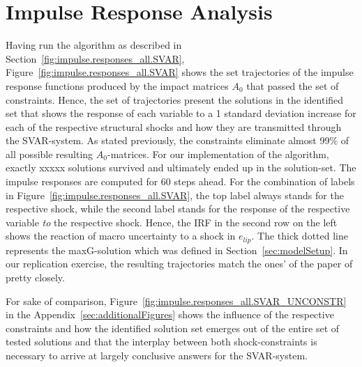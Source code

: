\documentclass[a4paper,11pt,listof=nochaptergap,oneside,pointednumbers,bibtotoc,bigheadings,liststotoc]{scrbook}
\theoremstyle{mysatz}
\theoremstyle{mydefinition}
\theoremstyle{mytheorem}
\theoremstyle{mybemerkung}
\begin{document}
\section[Impulse Response Analysis]{Impulse Response Analysis}
\label{sec:ImpulseResponseAnalysis}
Having run the algorithm as described in Section~\ref{fig:impulse.responses_all.SVAR}, Figure~\ref{fig:impulse.responses_all.SVAR} shows the set trajectories of the impulse response functions produced by the impact matrices $A_0$ that passed the set of constraints. Hence, the set of trajectories present the solutions in the identified set that shows the response of each variable to a 1 standard deviation increase for each of the respective structural shocks and how they are transmitted through the SVAR-system. As stated previously, the constraints eliminate almost 99\% of all possible resulting $A_0$-matrices. For our implementation of the algorithm, exactly xxxxx solutions survived and ultimately ended up in the solution-set. The impulse responses are computed for 60 steps ahead. For the combination of labels in Figure~\ref{fig:impulse.responses_all.SVAR}, the top label always stands for the respective shock, while the second label stands for the response of the respective variable \textit{to} the respective shock. Hence, the IRF in the second row on the left shows the reaction of macro uncertainty to a shock in $e_{lip}$. The thick dotted line represents the maxG-solution which was defined in Section~\ref{sec:modelSetup}. In our replication exercise, the resulting trajectories match the ones' of the paper of \citet{ludvigsonetal:18} pretty closely. 

For sake of comparison, Figure~\ref{fig:impulse.responses_all.SVAR_UNCONSTR} in the Appendix~\ref{sec:additionalFigures} shows the influence of the respective constraints and how the identified solution set emerges out of the entire set of tested solutions and that the interplay between both shock-constraints is necessary to arrive at largely conclusive answers for the SVAR-system. 
\end{document}
